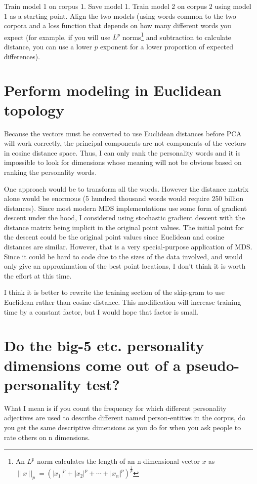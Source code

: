 \documentclass[eric_thesis.tex]{subfiles}
\begin{document}
Train model 1 on corpus 1. Save model 1. Train model 2 on corpus 2 using model 1 as a starting point. Align the two models (using words common to the two corpora and a loss function that depends on how many different words you expect (for example, if you will use $L^p$ norms\footnote{An $L^p$ norm calculates the length of an n-dimensional vector $x$ as $\|x\|_p=\left(|x_1|^p+|x_2|^p+\dotsb+|x_n|^p\right)^{\frac{1}{p}}$} and subtraction to calculate distance, you can use a lower $p$ exponent for a lower proportion of expected differences).

\section{Perform modeling in Euclidean topology}

Because the vectors must be converted to use Euclidean distances before PCA will work correctly, the principal components are not components of the vectors in cosine distance space. Thus, I can only rank the personality words and it is impossible to look for dimensions whose meaning will not be obvious based on ranking the personality words.

One approach would be to transform all the words. However the distance matrix alone would be enormous (5 hundred thousand words would require 250 billion distances). Since most modern MDS implementations use some form of gradient descent under the hood, I considered using stochastic gradient descent with the distance matrix being implicit in the original point values. The initial point for the descent could be the original point values since Euclidean and cosine distances are similar. However, that is a very special-purpose application of MDS. Since it could be hard to code due to the sizes of the data involved, and would only give an approximation of the best point locations, I don't think it is worth the effort at this time.

I think it is better to rewrite the training section of the skip-gram to use Euclidean rather than cosine distance. This modification will increase training time by a constant factor, but I would hope that factor is small.

\section{Do the big-5 etc. personality dimensions come out of a pseudo-personality test?}
What I mean is if you count the frequency for which different personality adjectives are used to describe different named person-entities in the corpus, do you get the same descriptive dimensions as you do for when you ask people to rate others on n dimensions.
\end{document}
